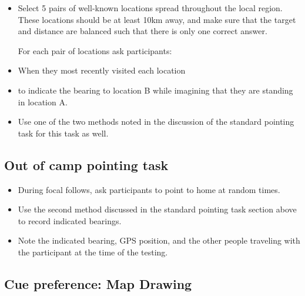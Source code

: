 \documentclass{article}
\begin{document}
\begin{itemize}

\item Select 5 pairs of well-known locations spread throughout the local region.  These locations should be at least 10km away, and make sure that the target and distance are balanced such that there is only one correct answer.

For each pair of locations ask participants:

\item When they most recently visited each location

\item to indicate the bearing to location B while imagining that they are standing in location A.

\item Use one of the two methods noted in the discussion of the standard pointing task for this task as well.

\end{itemize}


\subsection{Out of camp pointing task}

\begin{itemize}

\item During focal follows, ask participants to point to home at random times.

\item Use the second method discussed in the standard pointing task section above to record indicated bearings.

\item Note the indicated bearing, GPS position, and the other people traveling with the participant at the time of the testing.

\end{itemize}


\subsection{Cue preference: Map Drawing}
\end{document}
